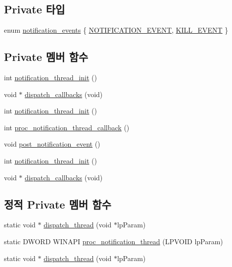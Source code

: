 \subsection*{Private 타입}
\begin{DoxyCompactItemize}
\item 
enum \hyperlink{classavdecc__lib_1_1notification__imp_a570ddfbed52c9ce40b6e75dee6def8bb}{notification\+\_\+events} \{ \hyperlink{classavdecc__lib_1_1notification__imp_a570ddfbed52c9ce40b6e75dee6def8bbaca375b46d93fb0471328c1aa6047a6aa}{N\+O\+T\+I\+F\+I\+C\+A\+T\+I\+O\+N\+\_\+\+E\+V\+E\+NT}, 
\hyperlink{classavdecc__lib_1_1notification__imp_a570ddfbed52c9ce40b6e75dee6def8bba12fd5235623f6f4bf3b5bb5b4996b44c}{K\+I\+L\+L\+\_\+\+E\+V\+E\+NT}
 \}
\end{DoxyCompactItemize}
\subsection*{Private 멤버 함수}
\begin{DoxyCompactItemize}
\item 
int \hyperlink{classavdecc__lib_1_1notification__imp_aeef7e3f8b421630aeed4403abd5eb12b}{notification\+\_\+thread\+\_\+init} ()
\item 
void $\ast$ \hyperlink{classavdecc__lib_1_1notification__imp_a8ffe33a0a5a99f068bc825b91b08fea4}{dispatch\+\_\+callbacks} (void)
\item 
int \hyperlink{classavdecc__lib_1_1notification__imp_aeef7e3f8b421630aeed4403abd5eb12b}{notification\+\_\+thread\+\_\+init} ()
\item 
int \hyperlink{classavdecc__lib_1_1notification__imp_aab652fd1c72683f60f01cf1976dee0ed}{proc\+\_\+notification\+\_\+thread\+\_\+callback} ()
\item 
void \hyperlink{classavdecc__lib_1_1notification__imp_a0b3ddaa8a01f87a1c9a13b4ff2ae0bfe}{post\+\_\+notification\+\_\+event} ()
\item 
int \hyperlink{classavdecc__lib_1_1notification__imp_aeef7e3f8b421630aeed4403abd5eb12b}{notification\+\_\+thread\+\_\+init} ()
\item 
void $\ast$ \hyperlink{classavdecc__lib_1_1notification__imp_a40bd48901576e19c42fa47c0c9ff3185}{dispatch\+\_\+callbacks} (void)
\end{DoxyCompactItemize}
\subsection*{정적 Private 멤버 함수}
\begin{DoxyCompactItemize}
\item 
static void $\ast$ \hyperlink{classavdecc__lib_1_1notification__imp_a7c58655bed289d0e08b2a34a14be2525}{dispatch\+\_\+thread} (void $\ast$lp\+Param)
\item 
static D\+W\+O\+RD W\+I\+N\+A\+PI \hyperlink{classavdecc__lib_1_1notification__imp_a810e8c63f59dcb9660bd1a9d77443815}{proc\+\_\+notification\+\_\+thread} (L\+P\+V\+O\+ID lp\+Param)
\item 
static void $\ast$ \hyperlink{classavdecc__lib_1_1notification__imp_ab76099a57f1341a13825734a0bbbdaf9}{dispatch\+\_\+thread} (void $\ast$lp\+Param)
\end{DoxyCompactItemize}
